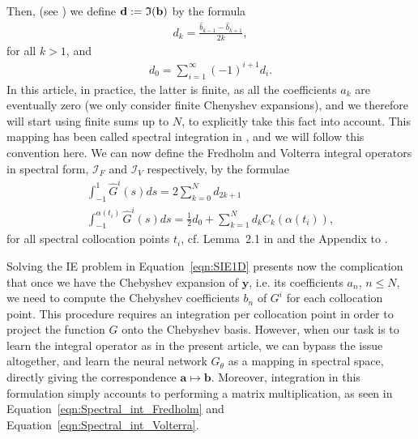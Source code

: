 \documentclass[11pt,fleqn]{amsart} %
\begin{document}
	Then, (see \cite{Greengard,Got-Ors}) we define $\mathbf d := \frak I(\mathbf b)$ by the formula
	\begin{eqnarray}
	d_k = \frac{\hat b_{k-1}-\hat b_{k+1}}{2k},
	\end{eqnarray}
	for all $k>1$, and
	\begin{eqnarray}
	d_0 = \sum_{i=1}^{\infty} (-1)^{i+1} d_i. 
	\end{eqnarray}
	In this article, in practice, the latter is finite, as all the coefficients $a_k$ are eventually zero (we only consider finite Chenyshev expansions), and we therefore will start using finite sums up to $N$, to explicitly take this fact into account. This mapping has been called spectral integration in \cite{Greengard}, and we will follow this convention here. We can now define the Fredholm and Volterra integral operators in spectral form, $\mathcal I_F$ and $\mathcal I_V$ respectively,  by the formulae
	\begin{eqnarray}
	\int_{-1}^1 \hat G^i(s)ds = 2\sum_{k=0}^N d_{2k+1}  \label{eqn:Spectral_int_Fredholm}\\
	\int_{-1}^{\alpha(t_i)} \hat G^i(s)ds = \frac{1}{2} d_0 + \sum_{k=1}^N d_kC_k(\alpha(t_i)), \label{eqn:Spectral_int_Volterra}
	\end{eqnarray}
	for all spectral collocation points $t_i$, cf. Lemma~2.1 in \cite{Greengard} and the Appendix to \cite{Got-Ors}. 
	
	Solving the IE problem in Equation~\eqref{eqn:SIE1D} presents now the complication that once we have the Chebyshev expansion of $\mathbf y$, i.e. its coefficients $a_n$, $n\leq N$, we need to compute the Chebyshev coefficients $b_n$ of $G^i$ for each collocation point. This procedure requires an integration per collocation point in order to project the function $G$ onto the Chebyshev basis. However, when our task is to learn the integral operator as in the present article, we can bypass the issue altogether, and learn the neural network $G_\theta$ as a mapping in spectral space, directly giving the correspondence $\mathbf a \mapsto \mathbf b$. Moreover, integration in this formulation simply accounts to performing a matrix multiplication, as seen in Equation~\eqref{eqn:Spectral_int_Fredholm} and Equation~\eqref{eqn:Spectral_int_Volterra}.
	
	
	
\end{document}
